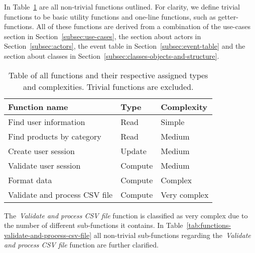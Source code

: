 In Table~\ref{tab:functions} are all non-trivial functions outlined.
For clarity, we define trivial functions to be basic utility functions and one-line functions, such as getter-functions.
All of these functions are derived from a combination of the use-cases section in Section~\ref{subsec:use-cases},
the section about actors in Section~\ref{subsec:actors}, the event table in Section~\ref{subsec:event-table} and the
section about classes in Section~\ref{subsec:classes-objects-and-structure}.

\begin{table}[h]
    \begin{tabularx}{\textwidth}{ l X X }
        \toprule
        \textbf{Function name}
        & \textbf{Type}
        & \textbf{Complexity}
        \\ \midrule
        Find user information
        & Read
        & Simple
        \\ \midrule
        Find products by category
        & Read
        & Medium
        \\ \midrule
        Create user session
        & Update
        & Medium
        \\ \midrule
        Validate user session
        & Compute
        & Medium
        \\ \midrule
        Format data
        & Compute
        & Complex
        \\ \midrule
        Validate and process CSV file
        & Compute
        & Very complex
        \\ \bottomrule
    \end{tabularx}
    \caption{Table of all functions and their respective assigned types and complexities.
    Trivial functions are excluded.
    }\label{tab:functions}
\end{table}

The~\textit{Validate and process CSV file} function is classified as very complex due to the number of different
sub-functions it contains.
In Table~\ref{tab:functions-validate-and-process-csv-file} all non-trivial sub-functions regarding
the~\textit{Validate and process CSV file} function are further clarified.

